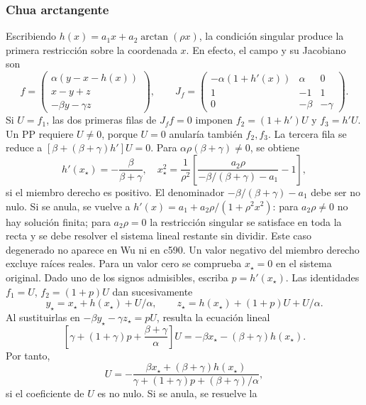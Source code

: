 \subsubsection{Chua arctangente}

Escribiendo \(h(x)=a_1x+a_2\arctan(\rho x)\), la condición singular produce
la primera restricción sobre la coordenada \(x\). En efecto, el campo y su
Jacobiano son
\[
 f=\begin{pmatrix}\alpha(y-x-h(x))\\x-y+z\\-\beta y-\gamma z\end{pmatrix},
 \qquad
 J_f=\begin{pmatrix}
 -\alpha(1+h'(x))&\alpha&0\\1&-1&1\\0&-\beta&-\gamma
 \end{pmatrix}.
\]
Si \(U=f_1\), las dos primeras filas de \(J_ff=0\) imponen
\(f_2=(1+h')U\) y \(f_3=h'U\). Un PP requiere \(U\ne0\), porque
\(U=0\) anularía también \(f_2,f_3\). La tercera fila se reduce a
\([\beta+(\beta+\gamma)h']U=0\). Para
\(\alpha\rho(\beta+\gamma)\ne0\), se obtiene
\begin{equation}
 h'(x_\star)=-\frac{\beta}{\beta+\gamma},
 \quad
 x_\star^2=\frac1{\rho^2}
 \left[
 \frac{a_2\rho}{-\beta/(\beta+\gamma)-a_1}-1
 \right],
 \label{eq:pp-chua-arctan-x}
\end{equation}
si el miembro derecho es positivo. El denominador
\(-\beta/(\beta+\gamma)-a_1\) debe ser no nulo. Si se anula, se vuelve a
\(h'(x)=a_1+a_2\rho/(1+\rho^2x^2)\): para \(a_2\rho\ne0\) no hay
solución finita; para \(a_2\rho=0\) la restricción singular se satisface
en toda la recta y se debe resolver el sistema lineal restante sin
dividir. Este caso degenerado no aparece en Wu ni en c590. Un valor negativo del
miembro derecho excluye raíces reales. Para un valor cero se comprueba
\(x_\star=0\) en el sistema original. Dado uno de los signos admisibles,
escriba \(p=h'(x_\star)\). Las identidades
\(f_1=U\), \(f_2=(1+p)U\) dan sucesivamente
\[
 y_\star=x_\star+h(x_\star)+U/\alpha,
 \qquad
 z_\star=h(x_\star)+(1+p)U+U/\alpha.
\]
Al sustituirlas en \(-\beta y_\star-\gamma z_\star=pU\), resulta la
ecuación lineal
\[
 \left[\gamma+(1+\gamma)p+\frac{\beta+\gamma}{\alpha}\right]U
 =-\beta x_\star-(\beta+\gamma)h(x_\star).
\]
Por tanto,
\begin{equation}
 U=-\frac{\beta x_\star+(\beta+\gamma)h(x_\star)}
 {\gamma+(1+\gamma)p+(\beta+\gamma)/\alpha},
\end{equation}
si el coeficiente de \(U\) es no nulo. Si se anula, se resuelve la
